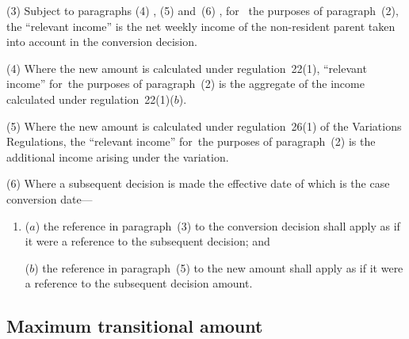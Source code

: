 \documentclass[12pt,a4paper]{article}
\begin{document}
(3) 
Subject to 
  paragraphs (4)%
    , (5) and~(6)%
, for~ %
the purposes of paragraph~(2), the “relevant income” is the net weekly income of the non-resident parent taken into account in the conversion decision.

(4) Where the new amount is calculated under regulation~22(1), “relevant income” for~the purposes of paragraph~(2) is the aggregate of the income calculated under regulation~22(1)($b$).

(5) Where the new amount is calculated under regulation~26(1) of the Variations Regulations, the “relevant income” for~the purposes of paragraph~(2) is the additional income arising under the variation.

(6) Where a subsequent decision is made the effective date of which is the case conversion date—
\begin{enumerate}\item[]
($a$) the reference in paragraph~(3) to the conversion decision shall apply as if it were a reference to the subsequent decision; and

($b$) the reference in paragraph~(5) to the new amount shall apply as if it were a reference to the subsequent decision amount.
\end{enumerate}


\subsection[25. Maximum transitional amount]{Maximum transitional amount}
\end{document}
